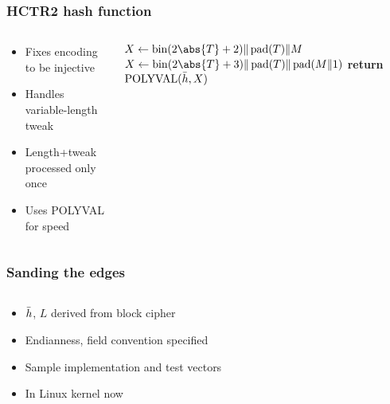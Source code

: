 \documentclass[aspectratio=169]{beamer}
\newenvironment*{figslide}{
    \begin{columns}
        \begin{column}{.4\textwidth}

}{
\end{column}
\begin{column}{.6\textwidth}
    \begin{figure}
        
    \end{figure}
\end{column}
\end{columns}
}
\begin{document}
\begin{frame}
    \frametitle{HCTR2 hash function}
    \begin{columns}
        \begin{column}{.4\textwidth}
            \begin{itemize}
                \item Fixes encoding to be injective
                \item Handles variable-length tweak
                \item Length+tweak processed only once
                \item Uses POLYVAL for speed
            \end{itemize}
        \end{column}
        \begin{column}{.6\textwidth}
            \begin{algorithmic}
                    \State \(X \gets \fromint(2\abs{T} + 2) \Concat \pad(T) \Concat M\)
                \Else
                    \State \(X \gets \fromint(2\abs{T} + 3) \Concat \pad(T) \Concat \pad(M \Concat 1)\)
                \EndIf
                \State \textbf{return} \(\operatorname{POLYVAL}(\bar{h}, X)\)
                \EndProcedure
            \end{algorithmic}
        \end{column}
    \end{columns}
\end{frame}

\begin{frame}

\frametitle{Sanding the edges}
\begin{figslide}
    \begin{itemize}
        \item \(\bar{h}\), \(L\) derived from block cipher
        \item Endianness, field convention specified
        \item Sample implementation and test vectors
        \item In Linux kernel now
    \end{itemize}

\end{figslide}
\end{frame}
\end{document}
